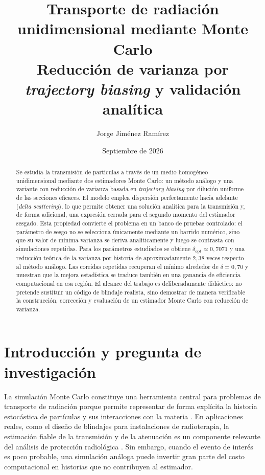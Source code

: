 \documentclass[11pt]{article}
\title{\textbf{Transporte de radiación unidimensional mediante Monte Carlo}\\[0.35em]
\large Reducción de varianza por \textit{trajectory biasing} y validación analítica}
\author{Jorge Jiménez Ramírez}
\date{Septiembre de 2026}
\begin{document}
\maketitle

\begin{abstract}
Se estudia la transmisión de partículas a través de un medio homogéneo unidimensional mediante dos estimadores Monte Carlo: un método análogo y una variante con reducción de varianza basada en \textit{trajectory biasing} por dilución uniforme de las secciones eficaces. El modelo emplea dispersión perfectamente hacia adelante (\textit{delta scattering}), lo que permite obtener una solución analítica para la transmisión y, de forma adicional, una expresión cerrada para el segundo momento del estimador sesgado. Esta propiedad convierte el problema en un banco de pruebas controlado: el parámetro de sesgo no se selecciona únicamente mediante un barrido numérico, sino que su valor de mínima varianza se deriva analíticamente y luego se contrasta con simulaciones repetidas. Para los parámetros estudiados se obtiene $\delta_{\mathrm{opt}}\approx 0{,}7071$ y una reducción teórica de la varianza por historia de aproximadamente $2{,}38$ veces respecto al método análogo. Las corridas repetidas recuperan el mínimo alrededor de $\delta=0{,}70$ y muestran que la mejora estadística se traduce también en una ganancia de eficiencia computacional en esa región. El alcance del trabajo es deliberadamente didáctico: no pretende sustituir un código de blindaje realista, sino demostrar de manera verificable la construcción, corrección y evaluación de un estimador Monte Carlo con reducción de varianza.
\end{abstract}

\tableofcontents
\newpage

\section{Introducción y pregunta de investigación}
La simulación Monte Carlo constituye una herramienta central para problemas de transporte de radiación porque permite representar de forma explícita la historia estocástica de partículas y sus interacciones con la materia \cite{vassiliev2017}. En aplicaciones reales, como el diseño de blindajes para instalaciones de radioterapia, la estimación fiable de la transmisión y de la atenuación es un componente relevante del análisis de protección radiológica \cite{quintero2023}. Sin embargo, cuando el evento de interés es poco probable, una simulación análoga puede invertir gran parte del costo computacional en historias que no contribuyen al estimador.
\end{document}
